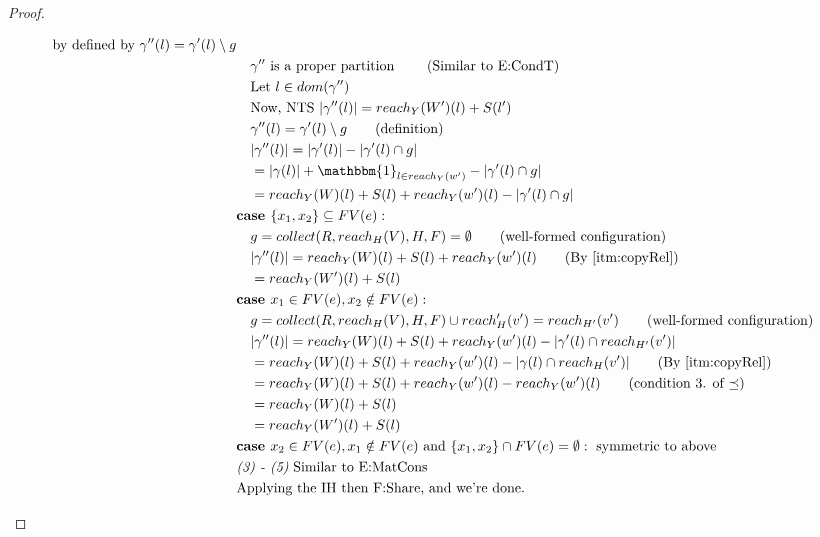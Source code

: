 \documentclass{easychair}
\theoremstyle{definition}
\begin{document}
\begin{proof}
\begin{description}
\begin{align*}
			\text{ by defined by } \gamma''(l) =  \gamma'(l) \setminus g\\
		&\quad \gamma'' \text{ is a proper partition } \tag{Similar to E:CondT}\\
		&\quad \text{Let } l \in dom(\gamma'')\\
		&\quad \text{Now, NTS } |\gamma''(l)| = reach_{Y}(W')(l) + S(l')\\
		&\quad \gamma''(l) = \gamma'(l) \setminus g \tag{definition}\\ 
		&\quad |\gamma''(l)| = |\gamma'(l)| - |\gamma'(l) \cap g|\\
		&\quad = |\gamma(l)| + \mathbbm{1}_{l \in reach_Y(w')} - |\gamma'(l) \cap g|\\
		&\quad = reach_Y(W)(l) + S(l) + reach_Y(w')(l) - |\gamma'(l) \cap g|\\
		&\textbf{case } \{x_1,x_2\} \subseteq FV(e):\\
		&\quad g = collect(R,reach_H(V),H,F) = \emptyset \tag{well-formed configuration}\\
		&\quad |\gamma''(l)| = reach_Y(W)(l) + S(l) + reach_Y(w')(l) \tag{By \ref{itm:copyRel}}\\
		&\quad = reach_Y(W')(l) + S(l) \\
		&\textbf{case } x_1 \in FV(e), x_2 \notin FV(e):\\
		&\quad g = collect(R,reach_H(V),H,F) \cup reach_H'(v') = reach_{H'}(v') 
			\tag{well-formed configuration}\\
		&\quad |\gamma''(l)| = reach_Y(W)(l) + S(l) + reach_Y(w')(l)
			- |\gamma'(l) \cap reach_{H'}(v')|\\
		&\quad = reach_Y(W)(l) + S(l) + reach_Y(w')(l) - |\gamma(l) \cap reach_H(v')|
			\tag{By \ref{itm:copyRel}}\\
		&\quad = reach_Y(W)(l) + S(l) + reach_Y(w')(l) - reach_Y(w')(l) 
			\tag{condition 3. of $\preceq$}\\
		&\quad = reach_Y(W)(l) + S(l)\\
		&\quad = reach_Y(W')(l) + S(l)\\
		&\textbf{case } x_2 \in FV(e), x_1 \notin FV(e) 
			\text{ and } \{x_1,x_2\} \cap FV(e) = \emptyset: \text{ symmetric to above}\\
		&\emph{(3) - (5)} \text{ Similar to E:MatCons}\\ 
		&\text{Applying the IH then F:Share, and we're done. }
	\end{align*}
  \end{description}
\end{proof}




\end{document}
